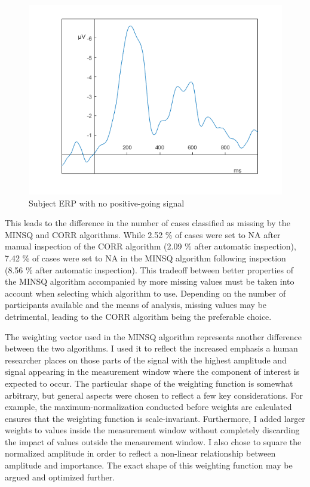 \documentclass[
  man]{apa7}
\begin{document}
\begin{figure}
\includegraphics[width=0.75\linewidth]{images/only_negative_signal_example} \caption{Subject ERP with no positive-going signal}\label{fig:only-negative-example}
\end{figure}

This leads to the difference in the number of cases classified as missing by the MINSQ and CORR algorithms. While 2.52 \% of cases were set to NA after manual inspection of the CORR algorithm (2.09 \% after automatic inspection), 7.42 \% of cases were set to NA in the MINSQ algorithm following inspection (8.56 \% after automatic inspection). This tradeoff between better properties of the MINSQ algorithm accompanied by more missing values must be taken into account when selecting which algorithm to use. Depending on the number of participants available and the means of analysis, missing values may be detrimental, leading to the CORR algorithm being the preferable choice.

The weighting vector used in the MINSQ algorithm represents another difference between the two algorithms. I used it to reflect the increased emphasis a human researcher places on those parts of the signal with the highest amplitude and signal appearing in the measurement window where the component of interest is expected to occur. The particular shape of the weighting function is somewhat arbitrary, but general aspects were chosen to reflect a few key considerations. For example, the maximum-normalization conducted before weights are calculated ensures that the weighting function is scale-invariant. Furthermore, I added larger weights to values inside the measurement window without completely discarding the impact of values outside the measurement window. I also chose to square the normalized amplitude in order to reflect a non-linear relationship between amplitude and importance. The exact shape of this weighting function may be argued and optimized further.
\end{document}
